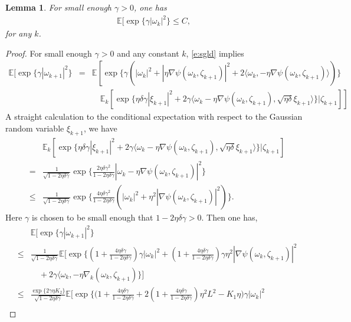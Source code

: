\documentclass[12pt]{amsart}
\newtheorem{lemma}[theorem]{Lemma}
\theoremstyle{definition}
\theoremstyle{remark}
\numberwithin{equation}{section}
\newcommand{\E}{\mathbb{E}}            %
\newcommand{\Ll}{\langle}
\newcommand{\Rr}{\rangle}
\begin{document}
\begin{lemma}\label{lem:expmoment}
	For small enough $\gamma>0$, one has
	\begin{eqnarray*}
		\E[\exp\{\gamma|\omega_{k}|^2\}\le C,
	\end{eqnarray*}
	for any $k$.
\end{lemma}
\begin{proof}

For small enough $\gamma>0$ and any constant $k$, \eqref{e:sgld} implies
\begin{eqnarray*}
	\E[\exp\{\gamma|\omega_{k+1}|^2\}
	&=& \E\left[\exp\big\{\gamma(|\omega_k|^2+|\eta \nabla \psi(\omega_k, \zeta_{k+1})|^2+2\Ll\omega_k,-\eta \nabla \psi(\omega_k, \zeta_{k+1})\Rr)\big\}\right. \\
	&& \left.\quad \E_k[\exp \{\eta \delta \gamma|\xi_{k+1}|^2+2\gamma\langle\omega_k-\eta \nabla \psi(\omega_k, \zeta_{k+1}), \sqrt{\eta \delta} \xi_{k+1}\rangle \}|\zeta_{k+1}]\right]
\end{eqnarray*}
A straight calculation to the conditional expectation with respect to the Gaussian random variable $\xi_{k+1}$, we have
\begin{eqnarray*}
	&&\E_k[\exp \{\eta \delta \gamma|\xi_{k+1}|^2+2\gamma\langle\omega_k-\eta \nabla \psi(\omega_k, \zeta_{k+1}), \sqrt{\eta \delta} \xi_{k+1}\rangle \}| \zeta_{k+1}]\\
	&=& \frac{1}{\sqrt{1-2 \eta \delta \gamma}}  \exp \big\{ \frac{2\eta \delta \gamma^2}{1-2 \eta\delta\gamma}\left|\omega_k-\eta \nabla \psi\left(\omega_k, \zeta_{k+1}\right)\right|^2 \big\}\\
	&\le& \frac{1}{\sqrt{1-2 \eta \delta \gamma}}  \exp \big\{ \frac{4\eta \delta \gamma^2}{1-2 \eta\delta\gamma}(|\omega_k|^2+\eta^2 |\nabla \psi\left(\omega_k, \zeta_{k+1}\right)|^2) \big\}.
\end{eqnarray*}
Here $\gamma$ is chosen to be small enough that $1-2\eta\delta\gamma>0$.  Then one has,
\begin{eqnarray*}
	&&\E[\exp\{\gamma|\omega_{k+1}|^2\}\\
	&\le&\frac{1}{\sqrt{1-2\eta\delta\gamma}}\E\Big[\exp \big\{(1+\frac{4 \eta \delta \gamma}{1-2 \eta \delta \gamma}) \gamma|\omega_k|^2+(1+\frac{4 \eta \delta \gamma}{1-2 \eta \delta \gamma}) \gamma \eta^2 |\nabla \psi(\omega_k, \zeta_{k+1})|^2\\
	&&\quad+2 \gamma\Ll \omega_k,-\eta \nabla_k(\omega_k,\zeta_{k+1})\big\}\Big]\\
	&\le& \frac{\exp\{2\gamma\eta K_2\}}{\sqrt{1-2\eta\delta\gamma}}\E\Big[\exp \big\{\big(1+\frac{4 \eta \delta \gamma}{1-2 \eta \delta \gamma}+2(1+\frac{4 \eta \delta \gamma}{1-2 \eta \delta \gamma})\eta^2L^2-K_1\eta\big) \gamma|\omega_k|^2\\

\end{eqnarray*}
\end{proof}
\end{document}
